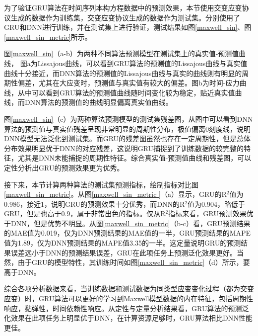 为了验证GRU算法在时间序列本构方程数据中的预测效果，本节使用交变应变协议生成的数据作为训练集，交变应变协议生成的数据作为测试集。分别使用了GRU和DNN进行训练，并在测试集上进行验证，测试结果如图\ref{maxwell_sin}、图\ref{maxwell_sin_metric}所示。

图\ref{maxwell_sin}（a-b）为两种不同算法预测模型在测试集上的真实值-预测值曲线，
图a为Lissajous曲线，可以看到GRU算法的预测值的Lissajous曲线与真实值曲线十分接近，而DNN算法的预测值的Lissajous曲线与真实的曲线则有明显的周期性偏差，尤其在大应变时，预测值与真实值有较大的偏差。图b为时间-应力曲线，从中可以看到GRU算法的预测值曲线随时间变化较为稳定，贴近真实值曲线，而DNN算法的预测值的曲线明显偏离真实值曲线。

图\ref{maxwell_sin}（c）为两种算法预测模型的测试集残差图，从图中可以看到DNN算法的预测值与真实值残差呈现非常明显的周期性分布，极值偏离0刻度线，说明DNN模型无法泛化到测试集。而GRU的残差图虽然也存在一定周期性，但是总体分布效果明显优于DNN的对应残差，这说明GRU捕捉到了训练数据的较完整的特征，尤其是DNN未能捕捉的周期性特征。综合真实值-预测值曲线和残差图，可以定性分析出GRU的预测效果更为优秀。


接下来，本节计算两种算法的测试集预测指标，绘制指标对比图\ref{maxwell_sin_metric}。从图\ref{maxwell_sin_metric
}（a）显示，GRU的R$^2$值为0.986，接近1，说明GRU的预测效果十分优秀，而DNN的R$^2$值为0.904，略低于GRU，但是也高于0.9，属于非常出色的指标。仅从R$^2$指标来看，GRU预测效果优于DNN，但是优势不明显。从图\ref{maxwell_sin_metric}（b-c）看，GRU预测结果的MAE值为0.019，仅为DNN预测结果的MAE值的一半，GRU预测结果的MAPE值为1.89，仅为DNN预测结果的MAPE值3.35的一半。这定量说明GRU的预测结果误差远小于DNN的预测结果误差，GRU在此项任务上预测泛化效果更好。当然，由于GRU的模型特性，其训练时间如图\ref{maxwell_sin_metric}（d）所示，要高于DNN。

综合各项分析数据来看，当训练数据和测试数据为同类型应变变化过程（都为交变应变）时，GRU算法可以更好的学习到Maxwell模型数据的内在特征，包括周期性响应，黏弹性，时间依赖性响应。从定性与定量分析结果看，GRU算法的预测泛化效果在此项任务上明显优于DNN，在计算资源足够时，GRU算法相比DNN性能更佳。


